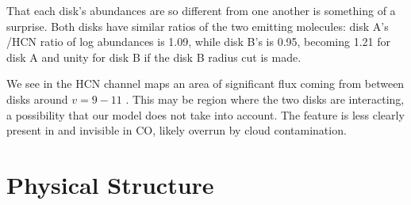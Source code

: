 That each disk's abundances are so different from one another is something of a surprise. Both disks have similar ratios of the two emitting molecules: disk A's \hco/HCN ratio of log abundances is 1.09, while disk B's is 0.95, becoming 1.21 for disk A and unity for disk B if the disk B radius cut is made.


We see in the HCN channel maps an area of significant flux coming from between disks around $ v = 9-11$ \kms. This may be region where the two disks are interacting, a possibility that our model does not take into account. The feature is less clearly present in \hco and invisible in CO, likely overrun by cloud contamination.





\section{Physical Structure}



